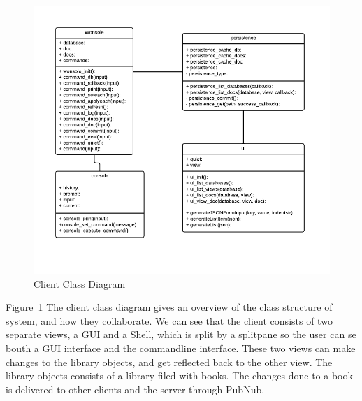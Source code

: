 \begin{figure}[h]
\centering
\includegraphics[width=6in]{image/clientClassDiagram.png}
\caption{Client Class Diagram}
\label{figure:clientClassDiagram}
\end{figure}

Figure~\ref{figure:clientClassDiagram} The client class diagram gives an overview of the class structure of system, and how they collaborate. We can see that the client consists of two separate views, a GUI and a Shell, which is split by a splitpane so the user can se bouth a GUI interface and the commandline interface. These two views can make changes to the library objects, and get reflected back to the other view. The library objects consists of a library filed with books. The changes done to a book is delivered to other clients and the server through PubNub. 


